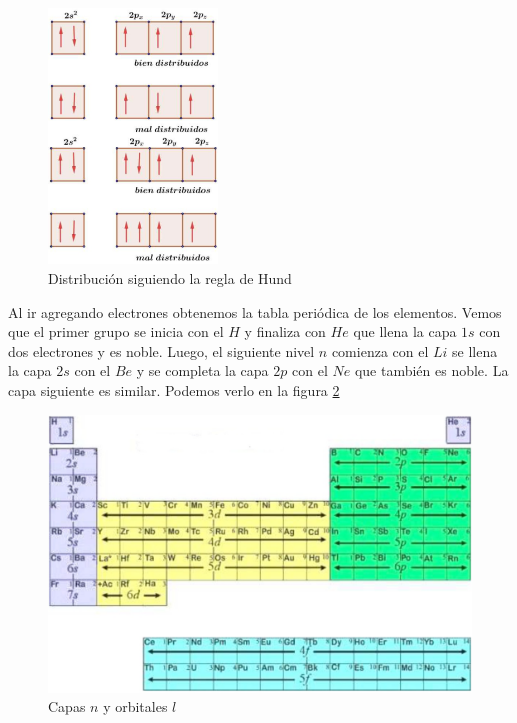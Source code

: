 \begin{figure}[H]
    \centering
    \includegraphics[width=0.4\textwidth]{./Figures/fig121}
	\caption{Distribución siguiendo la regla de Hund}
	\label{fig:121}
 \end{figure}

Al ir agregando electrones obtenemos la tabla periódica de los elementos. Vemos que el primer grupo se inicia con el $H$ y finaliza con $He$ que llena la capa $1s$ con dos electrones y es noble. Luego, el siguiente nivel $n$ comienza con el $Li$ se llena la capa $2s$ con el $Be$ y se completa la capa $2p$ con el $Ne$ que también es noble. La capa siguiente es similar. Podemos verlo en la figura \ref{fig:122}


\begin{figure}[H]
    \centering
    \includegraphics[width=1.0\textwidth]{./Figures/fig122}
	\caption{Capas $n$ y orbitales $l$}
	\label{fig:122}
 \end{figure}

